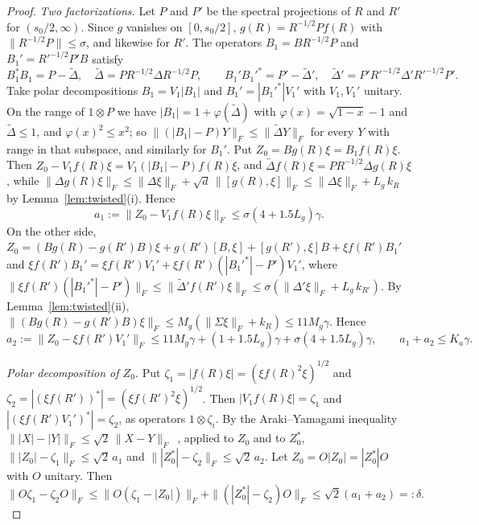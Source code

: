 \begin{proof}
\emph{Two factorizations.} Let $P$ and $P'$ be the spectral projections of $R$ and $R'$ for $(s_0/2,\infty)$. Since $g$ vanishes on $[0,s_0/2]$,
$g(R)=R^{-1/2}Pf(R)$ with $\|R^{-1/2}P\|\le\sigma$, and likewise for $R'$. The operators $B_1=BR^{-1/2}P$ and $B_1'=R'^{-1/2}P'B$ satisfy
\[
B_1^*B_1=P-\tilde\Delta,\quad \tilde\Delta=PR^{-1/2}\Delta R^{-1/2}P,\qquad B_1'B_1'^*=P'-\tilde\Delta',\quad\tilde\Delta'=P'R'^{-1/2}\Delta'R'^{-1/2}P'.
\]
Take polar decompositions $B_1=V_1|B_1|$ and $B_1'=|B_1'^*|V_1'$ with $V_1,V_1'$ unitary. On the range of $1\otimes P$ we have
$|B_1|=1+\varphi(\tilde\Delta)$ with $\varphi(x)=\sqrt{1-x}-1$ and $\tilde\Delta\le1$, and $\varphi(x)^2\le x^2$; so $\|(|B_1|-P)Y\|_F\le\|\tilde\Delta Y\|_F$
for every $Y$ with range in that subspace, and similarly for $B_1'$. Put $Z_0=Bg(R)\xi=B_1f(R)\xi$. Then
$Z_0-V_1f(R)\xi=V_1(|B_1|-P)f(R)\xi$, and $\tilde\Delta f(R)\xi=PR^{-1/2}\Delta g(R)\xi$, while
$\|\Delta g(R)\xi\|_F\le\|\Delta\xi\|_F+\sqrt d\,\|[g(R),\xi]\|_F\le\|\Delta\xi\|_F+L_g\,k_R$ by Lemma~\ref{lem:twisted}(i). Hence
\[
a_1:=\|Z_0-V_1f(R)\xi\|_F\le\sigma(4+1.5L_g)\gamma .
\]
On the other side,
$Z_0=(Bg(R)-g(R')B)\xi+g(R')[B,\xi]+[g(R'),\xi]B+\xi f(R')B_1'$ and $\xi f(R')B_1'=\xi f(R')V_1'+\xi f(R')(|B_1'^*|-P')V_1'$, where
$\|\xi f(R')(|B_1'^*|-P')\|_F\le\|\tilde\Delta'f(R')\xi\|_F\le\sigma(\|\Delta'\xi\|_F+L_g\,k_{R'})$. By Lemma~\ref{lem:twisted}(ii),
$\|(Bg(R)-g(R')B)\xi\|_F\le M_g(\|\Sigma\xi\|_F+k_R)\le11M_g\gamma$. Hence
\[
a_2:=\|Z_0-\xi f(R')V_1'\|_F\le11M_g\gamma+(1+1.5L_g)\gamma+\sigma(4+1.5L_g)\gamma,\qquad a_1+a_2\le K_a\gamma .
\]

\emph{Polar decomposition of $Z_0$.} Put $\zeta_1=|f(R)\xi|=(\xi f(R)^2\xi)^{1/2}$ and $\zeta_2=|(\xi f(R'))^*|=(\xi f(R')^2\xi)^{1/2}$. Then $|V_1f(R)\xi|=\zeta_1$ and $|(\xi f(R')V_1')^*|=\zeta_2$, as operators $1\otimes\zeta_i$. By the
Araki--Yamagami inequality $\||X|-|Y|\|_F\le\sqrt2\,\|X-Y\|_F$~\cite{ArakiYamagami1981}, applied to $Z_0$ and to $Z_0^*$,
$\||Z_0|-\zeta_1\|_F\le\sqrt2\,a_1$ and $\||Z_0^*|-\zeta_2\|_F\le\sqrt2\,a_2$. Let $Z_0=O|Z_0|=|Z_0^*|O$ with $O$ unitary. Then
\[
\|O\zeta_1-\zeta_2O\|_F\le\|O(\zeta_1-|Z_0|)\|_F+\|(|Z_0^*|-\zeta_2)O\|_F\le\sqrt2(a_1+a_2)=:\delta .
\]


\end{proof}
